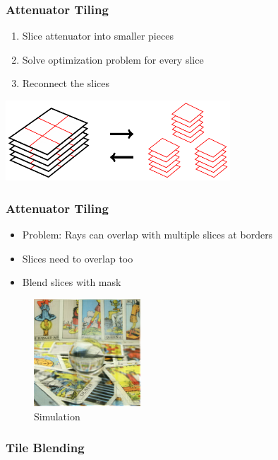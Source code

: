 \documentclass[12pt, compress]{beamer}
\begin{document}
\begin{frame}[fragile]
	\frametitle{Attenuator Tiling}
	
	\begin{enumerate}
		\item Slice attenuator into smaller pieces
		\item Solve optimization problem for every slice
		\item Reconnect the slices
	\end{enumerate}
	
	\vspace{1cm}
	
	\begin{center}
		\includegraphics[height = 3cm]{figures/slicing_attenuator/tiling_overview.pdf}
	\end{center}
\end{frame}

\begin{frame}[fragile]
	\frametitle{Attenuator Tiling}

	\begin{itemize}
		\item Problem: Rays can overlap with multiple slices at borders
		\item Slices need to overlap too
		\item Blend slices with mask
	\end{itemize}
	
	\begin{figure}
		\includegraphics[width=4cm]{figures/tiling/tarot_tiles3x3x200x200_no_overlap_3_layers/Reconstruction_of_view_(3,3).png}
		\caption*{Simulation}
	\end{figure}
\end{frame}

\begin{frame}[fragile]
	\frametitle{Tile Blending}

	\begin{figure}
		
		
	\end{figure}
\end{frame}
\end{document}
